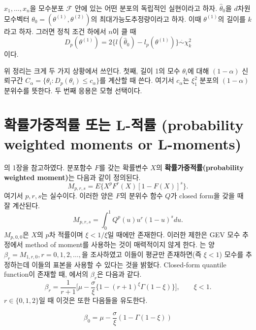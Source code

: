 \documentclass[b5paper,]{scrbook}
\theoremstyle{plain}
\theoremstyle{definition}
\numberwithin{equation}{section}
\let\BeginKnitrBlock\begin \let\EndKnitrBlock\end
\begin{document}
\BeginKnitrBlock{theorem}[프로파일 로그 가능도를 이용한 통계량의 점근분포]
\protect\hypertarget{thm:unnamed-chunk-441}{}{\label{thm:unnamed-chunk-441} {} }\(x_{1}, \ldots , x_{n}\)을 모수분포 \(\mathcal{F}\) 안에 있는 어떤 분포의 독립적인 실현이라고 하자. \(\hat{\theta}_{0}\)을 \(d\)차원 모수벡터 \(\theta_{0}=(\theta^{(1)},\theta^{(2)})\)의 최대가능도추정량이라고 하자. 이때 \(\theta^{(1)}\)의 길이를 \(k\)라고 하자. 그러면 정칙 조건 하에서 \(n\)이 클 때
\[D_{p}(\theta^{(1)})=2\{l(\hat{\theta}_{0})-l_{p}(\theta^{(1)}) \} \stackrel{\cdot}{\sim} \chi_{k}^{2}\]
이다.
\EndKnitrBlock{theorem}

위 정리는 크게 두 가지 상황에서 쓰인다. 첫째, 길이 1의 모수 \(\theta_{i}\)에 대해 \((1-\alpha)\) 신뢰구간 \(C_{\alpha}=\{\theta_{i}: D_{p}(\theta_{i})\leq c_{\alpha}\}\)를 계산할 때 쓴다. 여기서 \(c_{\alpha}\)는 \(\xi_{1}^{2}\) 분포의 \((1-\alpha)\) 분위수를 뜻한다. 두 번째 응용은 모형 선택이다.

\hypertarget{--l--probability-weighted-moments-or-l-moments}{%
\section{확률가중적률 또는 L-적률 (probability weighted moments or L-moments)}\label{--l--probability-weighted-moments-or-l-moments}}

\citep{Dey2015}의 1장을 참고하였다. 분포함수 \(F\)를 갖는 확률변수 \(X\)의 \textbf{확률가중적률(probability weighted moment)}는 다음과 같이 정의된다.
\[M_{p,r,s}=E\{ X^{p}F^{r}(X)[1-F(X)]^{s} \}.\]
여기서 \(p,r,s\)는 실수이다. 이러한 양은 \(F\)의 분위수 함수 \(Q\)가 closed form을 갖을 때 잘 계산된다.
\[M_{p,r,s} = \int_{0}^{1}Q^{p}(u)u^{r}(1-u)^{s}du.\]
\(M_{p,0,0}\)은 \(X\)의 \(p\)차 적률이며 \(\xi < 1/\xi\)일 때에만 존재한다. 이러한 제한은 GEV 모수 추정에서 method of moment를 사용하는 것이 매력적이지 않게 한다. \citep{Hosking1985}는 양 \(\beta_{r}=M_{1,r,0},r=0,1,2,\ldots,\)을 조사하였고 이들이 평균만 존재하면(즉 \(\xi<1\)) 모수를 추정하는데 이들의 표본을 사용할 수 있다는 것을 밝혔다. Closed-form quantile function이 존재할 때, \citep{Hosking1985}에서의 \(\beta_{r}\)은 다음과 같다.
\[\beta_{r}=\frac{1}{r+1}\Big[ \mu-\frac{\sigma}{\xi}\{ 1-(r+1)^{\xi}\Gamma(1-\xi) \} \Big],\qquad{\xi < 1}.\]
\(r\in\{0,1,2\}\)일 때 이것은 또한 다음들을 유도한다.

\begin{equation}
\beta_{0}=\mu -\frac{\sigma}{\xi}(1-\Gamma(1-\xi))
\label{eq:PWM01}
\end{equation}
\end{document}
